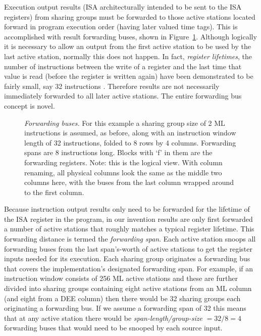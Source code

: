 \documentclass[10pt,dvips]{article}
\begin{document}
Execution output results (ISA architecturally intended to be sent to
the ISA 
registers) from sharing groups must be forwarded to those active
stations located forward in program execution order (having later
valued time tags).  This is accomplished with result forwarding
buses, shown in
Figure~\ref{forwardingbuses}.
Although logically it is necessary to allow an output from the first
active station to be used by the last active station, normally this
does not happen. In fact, {\it register lifetimes},
the number of
instructions between the write of a register and the last time that
value is read (before the register is written again)
have been demonstrated to be fairly small, say 32 instructions
\cite{Austin92}. Therefore 
results are
not necessarily immediately forwarded to all later active stations.
The entire forwarding bus concept is novel.

\begin{figure}
\centering
{}
\caption{{\em Forwarding buses.} For this example a
sharing group size of 2 ML
instructions is assumed, as before,
along with an instruction window length of 32 instructions, folded to
8 rows by 4 columns. Forwarding spans are 8 instructions long. Blocks with
`f' in them are the forwarding registers. Note: this is the logical view.
With column renaming, all physical columns look the same as the middle
two columns here, with the buses from the last column wrapped around to
the first column.}
\label{forwardingbuses}
\end{figure}

Because instruction output results only
need to be forwarded for the lifetime of the ISA register in the
program, in our invention
results are only first forwarded a number of active stations
that roughly matches a typical register lifetime.  This forwarding
distance is termed the {\it forwarding span}.  Each active station
snoops all forwarding buses from the last span's-worth of active
stations to get the register inputs needed for its execution.
Each sharing group originates a forwarding bus that covers the
implementation's designated forwarding span.  For example, if an
instruction window consists of 256 ML active stations and these are
further divided into sharing groups containing eight active stations
from an ML column (and eight from a DEE column) then there would be 32
sharing groups each originating a forwarding bus.  If we assume a
forwarding span of 32 this means that at
any active station there would be {\it span-length/group-size} $ = 32/8 = 4$
forwarding buses that would need
to be snooped by each source input.
\end{document}
